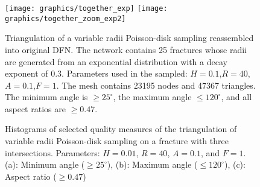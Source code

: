 \documentclass[preprint, 10pt]{elsarticle}
\theoremstyle{definition}
\theoremstyle{remark}
\begin{document}
\begin{figure}
	\centering
	\texttt{[image: graphics/together\_exp]} %
	\texttt{[image: graphics/together\_zoom\_exp2]}
	\caption{Triangulation of a variable radii Poisson-disk sampling reassembled into original DFN. The network contains 25 fractures whose radii are generated from an exponential distribution with a decay exponent of 0.3. Parameters used in the sampled: $H=0.1$,$R=40$,$A=0.1$,$F=1$. The mesh contains 23195 nodes and 47367 triangles. The minimum angle is $\ge 25^\circ$, the maximum angle $\le 120^\circ$, and all aspect ratios are $\ge0.47$. }
	\label{fig:togetherzoomexp}
\end{figure}

\begin{figure}
	\centering
	\caption{Histograms of selected quality measures of the triangulation of variable radii Poisson-disk sampling on a fracture with three intersections. Parameters: $H=0.01$, $R=40$, $A=0.1$, and $F=1$. (a): Minimum angle ($\ge 25^\circ$), (b): Maximum angle ($\le 120^\circ$), (c): Aspect ratio ($\ge 0.47$)}
	\label{fig:variablemaxangle}
\end{figure}

\end{document}
